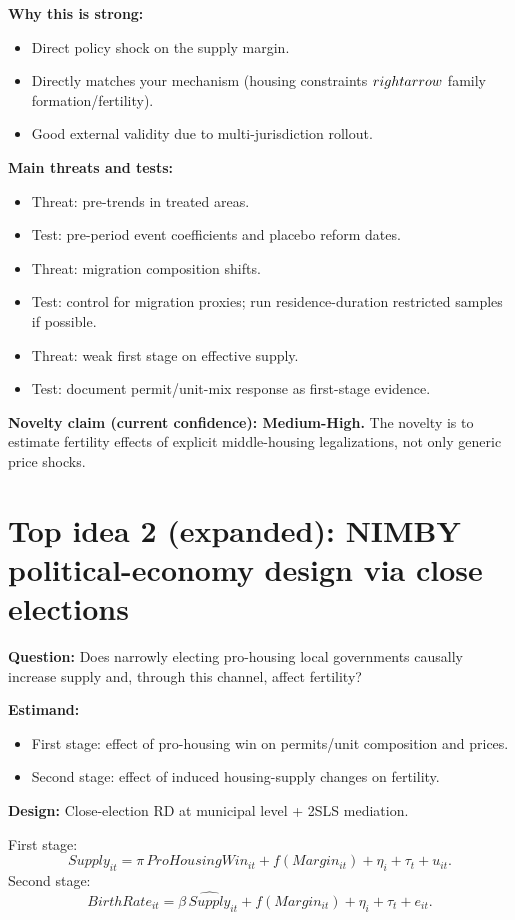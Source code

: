 \documentclass[11pt]{article}
\begin{document}
\textbf{Why this is strong:}
\begin{itemize}
\item Direct policy shock on the supply margin.
\item Directly matches your mechanism (housing constraints $\\rightarrow$ family formation/fertility).
\item Good external validity due to multi-jurisdiction rollout.
\end{itemize}

\textbf{Main threats and tests:}
\begin{itemize}
\item Threat: pre-trends in treated areas.
\item Test: pre-period event coefficients and placebo reform dates.
\item Threat: migration composition shifts.
\item Test: control for migration proxies; run residence-duration restricted samples if possible.
\item Threat: weak first stage on effective supply.
\item Test: document permit/unit-mix response as first-stage evidence.
\end{itemize}

\textbf{Novelty claim (current confidence): Medium-High.}
The novelty is to estimate fertility effects of explicit middle-housing legalizations, not only generic price shocks.

\section{Top idea 2 (expanded): NIMBY political-economy design via close elections}
\textbf{Question:} Does narrowly electing pro-housing local governments causally increase supply and, through this channel, affect fertility?

\textbf{Estimand:}
\begin{itemize}
\item First stage: effect of pro-housing win on permits/unit composition and prices.
\item Second stage: effect of induced housing-supply changes on fertility.
\end{itemize}

\textbf{Design:} Close-election RD at municipal level + 2SLS mediation.

First stage:
\[
Supply_{it} = \pi\,ProHousingWin_{it} + f(Margin_{it}) + \eta_i + \tau_t + u_{it}.
\]
Second stage:
\[
BirthRate_{it} = \beta\,\widehat{Supply}_{it} + f(Margin_{it}) + \eta_i + \tau_t + e_{it}.
\]
\end{document}
